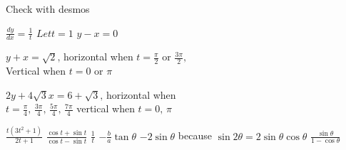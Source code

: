 \begin{Answer}[ref={exParametric}]
\Question Check with desmos%

\Question %
\begin{tasks}
	\task $\frac{d y}{d x} =\frac{1}{t}$
	\task $ Let t =1$
	\task $y -x =0$
\end{tasks}

\Question %
$y +x =\sqrt{2}\text{,}$ horizontal when $t =\frac{\pi }{2}$ or $\frac{3 \pi }{2}\text{,}$ \\Vertical when $t =0$ or $\pi $ 

\Question %
$2 y +4 \sqrt{3} x =6 +\sqrt{3}\text{,}$ horizontal when \\
$t =\frac{\pi }{4}\text{,}$ $\frac{3 \pi }{4}\text{,}$
 $\frac{5 \pi }{4}\text{,}$ $\frac{7 \pi }{4}$ vertical when $t =0\text{,}$ $\pi $

\Question %
\begin{tasks}
	\task $\frac{t \left (3 t^{2} +1\right )}{2 t +1}$ 
	\task $\frac{\cos  t +\sin  t}{\cos  t -\sin  t}$
	\task $\frac{1}{t}$ 
	\task $ -\frac{b}{a} \tan  \theta $ 
	\task $ -2 \sin  \theta $ because $\sin  2 \theta  =2 \sin  \theta  \cos  \theta $ 
	\task $\frac{\sin  \theta }{1 -\cos  \theta }$ 
\end{tasks}	
\end{Answer}%

